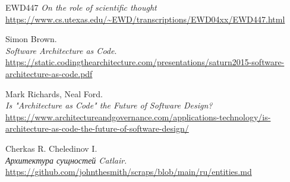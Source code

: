 \documentclass[final]{article}
\begin{document}
    \renewcommand{\refname}{References}
    \begin{thebibliography}{9}

         EWD447
        \textit{On the role of scientific thought}
        \url{https://www.cs.utexas.edu/~EWD/transcriptions/EWD04xx/EWD447.html}

        Simon Brown.\\
        \textit{Software Architecture as Code}.\\
        \url{https://static.codingthearchitecture.com/presentations/saturn2015-software-architecture-as-code.pdf}

        Mark Richards, Neal Ford.\\
        \textit{Is "Architecture as Code" the Future of Software Design?}\\
        \url{https://www.architectureandgovernance.com/applications-technology/is-architecture-as-code-the-future-of-software-design/}

        Cherkas R. Cheledinov I.\\
        \textit{Архитектура сущностей Catlair}.\\
        \url{https://github.com/johnthesmith/scraps/blob/main/ru/entities.md}


    \end{thebibliography}
\end{document}

